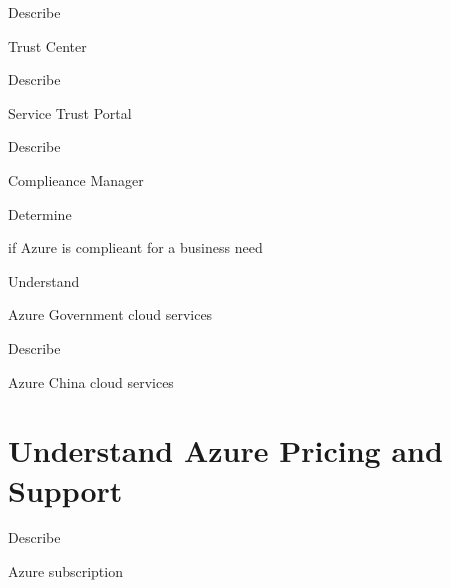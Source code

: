 \documentclass{scrartcl}
\newenvironment{flashcard}[2][]{%
    #1
    \vfill
    \centerline{\Large{#2}}
    \vfill
    \newpage
}
{\newpage}
\newcommand{\sectioncard}[1]{
    \vspace*{\stretch{1}}
    \section{#1}
    \vspace*{\stretch{1}}
    \pagebreak
}
\begin{document}
    \begin{flashcard}[Describe]{Trust Center}

    \end{flashcard}

    \begin{flashcard}[Describe]{Service Trust Portal}

    \end{flashcard}

    \begin{flashcard}[Describe]{Complieance Manager}

    \end{flashcard}

    \begin{flashcard}[Determine]{if Azure is complieant for a business need}

    \end{flashcard}

    \begin{flashcard}[Understand]{Azure Government cloud services}

    \end{flashcard}

    \begin{flashcard}[Describe]{Azure China cloud services}

    \end{flashcard}

    \sectioncard{Understand Azure Pricing and Support}

    \begin{flashcard}[Describe]{Azure subscription}

    \end{flashcard}
\end{document}
